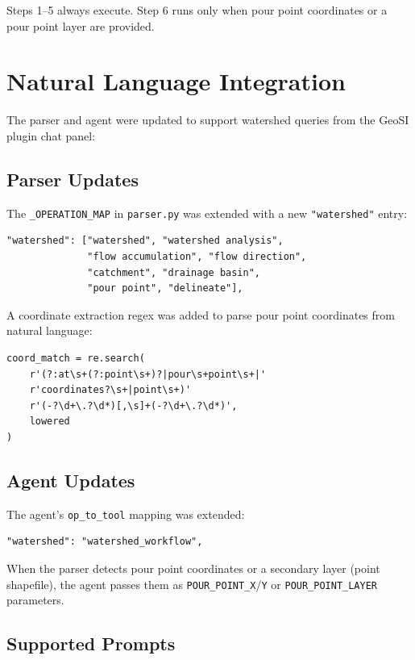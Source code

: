 Steps 1--5 always execute.  Step 6 runs only when pour point coordinates or a
pour point layer are provided.

\section{Natural Language Integration}

The parser and agent were updated to support watershed queries from the GeoSI
plugin chat panel:

\subsection{Parser Updates}

The \texttt{\_OPERATION\_MAP} in \texttt{parser.py} was extended with a new
\texttt{"watershed"} entry:

\begin{lstlisting}
"watershed": ["watershed", "watershed analysis",
              "flow accumulation", "flow direction",
              "catchment", "drainage basin",
              "pour point", "delineate"],
\end{lstlisting}

A coordinate extraction regex was added to parse pour point coordinates from
natural language:

\begin{lstlisting}
coord_match = re.search(
    r'(?:at\s+(?:point\s+)?|pour\s+point\s+|'
    r'coordinates?\s+|point\s+)'
    r'(-?\d+\.?\d*)[,\s]+(-?\d+\.?\d*)',
    lowered
)
\end{lstlisting}

\subsection{Agent Updates}

The agent's \texttt{op\_to\_tool} mapping was extended:

\begin{lstlisting}
"watershed": "watershed_workflow",
\end{lstlisting}

When the parser detects pour point coordinates or a secondary layer (point
shapefile), the agent passes them as \texttt{POUR\_POINT\_X}/\texttt{Y} or
\texttt{POUR\_POINT\_LAYER} parameters.

\subsection{Supported Prompts}


